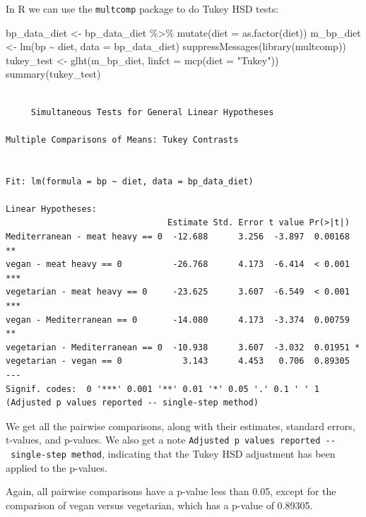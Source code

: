 \documentclass[
  letterpaper,
  8pt,
  a4paper]{book}
\newenvironment{Shaded}{\begin{snugshade}}{\end{snugshade}}
\newcommand{\AttributeTok}[1]{\textcolor[rgb]{0.40,0.45,0.13}{#1}}
\newcommand{\FunctionTok}[1]{\textcolor[rgb]{0.28,0.35,0.67}{#1}}
\newcommand{\NormalTok}[1]{\textcolor[rgb]{0.00,0.23,0.31}{#1}}
\newcommand{\OtherTok}[1]{\textcolor[rgb]{0.00,0.23,0.31}{#1}}
\newcommand{\SpecialCharTok}[1]{\textcolor[rgb]{0.37,0.37,0.37}{#1}}
\newcommand{\StringTok}[1]{\textcolor[rgb]{0.13,0.47,0.30}{#1}}
\begin{document}
In R we can use the \texttt{multcomp} package to do Tukey HSD tests:

\begin{Shaded}
\begin{Highlighting}[]
\NormalTok{bp\_data\_diet }\OtherTok{\textless{}{-}}\NormalTok{ bp\_data\_diet }\SpecialCharTok{\%\textgreater{}\%}
  \FunctionTok{mutate}\NormalTok{(}\AttributeTok{diet =} \FunctionTok{as.factor}\NormalTok{(diet))}
\NormalTok{m\_bp\_diet }\OtherTok{\textless{}{-}} \FunctionTok{lm}\NormalTok{(bp }\SpecialCharTok{\textasciitilde{}}\NormalTok{ diet, }\AttributeTok{data =}\NormalTok{ bp\_data\_diet)}
\FunctionTok{suppressMessages}\NormalTok{(}\FunctionTok{library}\NormalTok{(multcomp))}
\NormalTok{tukey\_test }\OtherTok{\textless{}{-}} \FunctionTok{glht}\NormalTok{(m\_bp\_diet, }\AttributeTok{linfct =} \FunctionTok{mcp}\NormalTok{(}\AttributeTok{diet =} \StringTok{"Tukey"}\NormalTok{))}
\FunctionTok{summary}\NormalTok{(tukey\_test)}
\end{Highlighting}
\end{Shaded}

\begin{verbatim}

     Simultaneous Tests for General Linear Hypotheses

Multiple Comparisons of Means: Tukey Contrasts


Fit: lm(formula = bp ~ diet, data = bp_data_diet)

Linear Hypotheses:
                                Estimate Std. Error t value Pr(>|t|)    
Mediterranean - meat heavy == 0  -12.688      3.256  -3.897  0.00168 ** 
vegan - meat heavy == 0          -26.768      4.173  -6.414  < 0.001 ***
vegetarian - meat heavy == 0     -23.625      3.607  -6.549  < 0.001 ***
vegan - Mediterranean == 0       -14.080      4.173  -3.374  0.00759 ** 
vegetarian - Mediterranean == 0  -10.938      3.607  -3.032  0.01951 *  
vegetarian - vegan == 0            3.143      4.453   0.706  0.89305    
---
Signif. codes:  0 '***' 0.001 '**' 0.01 '*' 0.05 '.' 0.1 ' ' 1
(Adjusted p values reported -- single-step method)
\end{verbatim}

We get all the pairwise comparisons, along with their estimates,
standard errors, t-values, and p-values. We also get a note
\texttt{Adjusted\ p\ values\ reported\ -\/-\ single-step\ method},
indicating that the Tukey HSD adjustment has been applied to the
p-values.

Again, all pairwise comparisons have a p-value less than 0.05, except
for the comparison of vegan versus vegetarian, which has a p-value of
0.89305.
\end{document}
